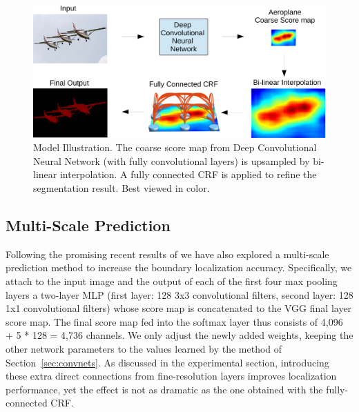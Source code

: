 \begin{figure}
  \centering
  \includegraphics[width=0.7\linewidth]{fig/model_illustration3.pdf}
  \caption{Model Illustration. The coarse score map from Deep
    Convolutional Neural Network (with fully convolutional layers) is
    upsampled by bi-linear interpolation. A fully connected CRF is
    applied to refine the segmentation result. Best viewed in color.}
  \label{fig:ModelIllustration}
\end{figure}

\subsection{Multi-Scale Prediction}
\label{sec:multiscale}

Following the promising recent results of \cite{hariharan2014hypercolumns,
  long2014fully} we have also explored a multi-scale prediction method to
increase the boundary localization accuracy. Specifically, we attach
to the input image and the output of each of the first four max
pooling layers a two-layer MLP (first layer: 128 3x3 convolutional
filters, second layer: 128 1x1 convolutional filters) whose score map
is concatenated to the VGG final layer score map. The final score map
fed into the softmax layer thus consists of 4,096 + 5 * 128 = 4,736
channels. We only adjust the newly added weights, keeping the other
network parameters to the values learned by the method of
Section~\ref{sec:convnets}. As discussed in the experimental section,
introducing these extra direct connections from fine-resolution layers
improves localization performance, yet the effect is not as dramatic
as the one obtained with the fully-connected CRF. 
